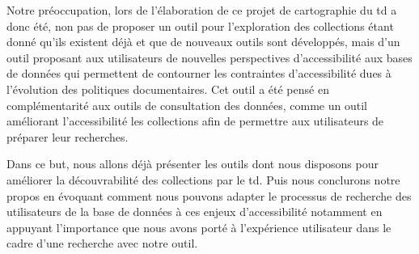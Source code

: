Notre préoccupation, lors de l'élaboration de ce projet de cartographie du \gls{td} a donc été, non pas de proposer un outil pour l'exploration des collections étant donné qu'ils existent déjà et que de nouveaux outils sont développés, mais d'un outil proposant aux utilisateurs de nouvelles perspectives d'accessibilité aux bases de données qui permettent de contourner les contraintes d'accessibilité dues à l'évolution des politiques documentaires. Cet outil a été pensé en complémentarité aux outils de consultation des données, comme un outil améliorant l'accessibilité les collections afin de permettre aux utilisateurs de préparer leur recherches. 

Dans ce but, nous allons déjà présenter les outils dont nous disposons pour améliorer la découvrabilité des collections par le \gls{td}. Puis nous conclurons notre propos en évoquant comment nous pouvons adapter le processus de recherche des utilisateurs de la base de données à ces enjeux d'accessibilité notamment en appuyant l'importance que nous avons porté à l'expérience utilisateur dans le cadre d'une recherche avec notre outil.  